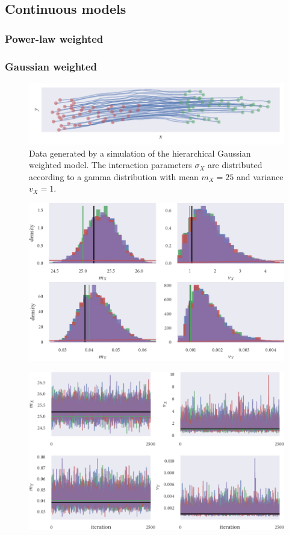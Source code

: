 \subsection{Continuous models}

\subsubsection{Power-law weighted}



\subsubsection{Gaussian weighted}

\begin{figure}[tbp]
  \includegraphics{gauss_hier_sim.pdf}
  \caption{Data generated by a simulation of the hierarchical Gaussian weighted model.
  The interaction parameters $\sigma_X$ are distributed according to a gamma distribution
  with mean $m_X=25$ and variance $v_X=1$.} 
\end{figure}
\begin{figure}[tbp]
  \includegraphics{gauss_hier_hist_hypers.pdf}
  \caption{}
\end{figure}
\begin{figure}[tbp]
  \includegraphics{gauss_hier_trace_hypers.pdf}
  \caption{}
\end{figure}
